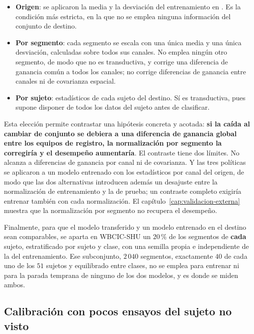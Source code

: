 \begin{itemize}
  \item \textbf{Origen}: se aplicaron la media y la desviación del entrenamiento en
  \openbmi{}. Es la condición más estricta, en la que no se emplea ninguna información del
  conjunto de destino.
  \item \textbf{Por segmento}: cada segmento se escala con una única media y una única
  desviación, calculadas sobre todos sus canales. No emplea ningún otro segmento, de modo
  que no es transductiva, y corrige una diferencia de ganancia común a todos los canales;
  no corrige diferencias de ganancia entre canales ni de covarianza espacial.
  \item \textbf{Por sujeto}: estadísticos de cada sujeto del destino. Sí es transductiva,
  pues supone disponer de todos los datos del sujeto antes de clasificar.
\end{itemize}

Esta elección permite contrastar una hipótesis concreta y acotada: \textbf{si la caída al
cambiar de conjunto se debiera a una diferencia de ganancia global entre los equipos de
registro, la normalización por segmento la corregiría y el desempeño aumentaría}. El
contraste tiene dos límites. No alcanza a diferencias de ganancia por canal ni de
covarianza. Y las tres políticas se aplicaron a un modelo entrenado con los estadísticos por
canal del origen, de modo que las dos alternativas introducen además un desajuste entre
la normalización de entrenamiento y la de prueba; un contraste completo exigiría entrenar
también con cada normalización. El capítulo~\ref{cap:validacion-externa} muestra que la
normalización por segmento no recupera el desempeño.

Finalmente, para que el modelo transferido y un modelo entrenado en el destino sean
comparables, se aparta en WBCIC-SHU un $20$\,\% de los segmentos de \textbf{cada} sujeto,
estratificado por sujeto y clase, con una semilla propia e independiente de la del
entrenamiento. Ese subconjunto, $2\,040$ segmentos, exactamente $40$ de cada uno de los
$51$ sujetos y equilibrado entre clases, no se emplea para entrenar ni para la parada
temprana de ninguno de los dos modelos, y es donde se miden ambos.

\subsection{Calibración con pocos ensayos del sujeto no visto}
\label{sec:metodo-fewshot}

